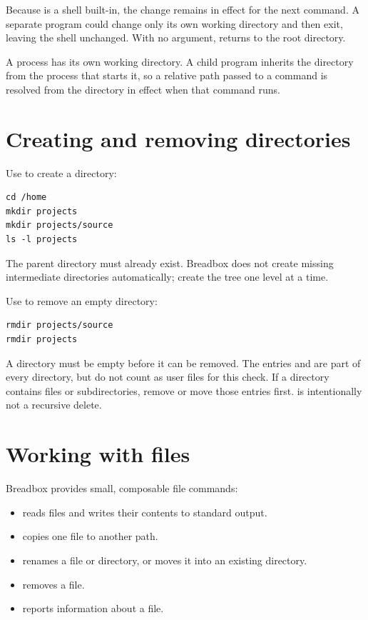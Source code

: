 Because  is a shell built-in, the change remains in effect for the next command. A separate program could change only its own working directory and then exit, leaving the shell unchanged. With no argument,  returns to the root directory.

A process has its own working directory. A child program inherits the directory from the process that starts it, so a relative path passed to a command is resolved from the directory in effect when that command runs.

\section{Creating and removing directories}

Use  to create a directory:

\begin{lstlisting}
cd /home
mkdir projects
mkdir projects/source
ls -l projects
\end{lstlisting}

The parent directory must already exist. Breadbox does not create missing intermediate directories automatically; create the tree one level at a time.

Use  to remove an empty directory:

\begin{lstlisting}
rmdir projects/source
rmdir projects
\end{lstlisting}

A directory must be empty before it can be removed. The entries  and  are part of every directory, but do not count as user files for this check. If a directory contains files or subdirectories, remove or move those entries first.  is intentionally not a recursive delete.

\section{Working with files}

Breadbox provides small, composable file commands:

\begin{itemize}
  \item {} reads files and writes their contents to standard output.
  \item {} copies one file to another path.
  \item {} renames a file or directory, or moves it into an existing directory.
  \item {} removes a file.
  \item {} reports information about a file.
\end{itemize}

